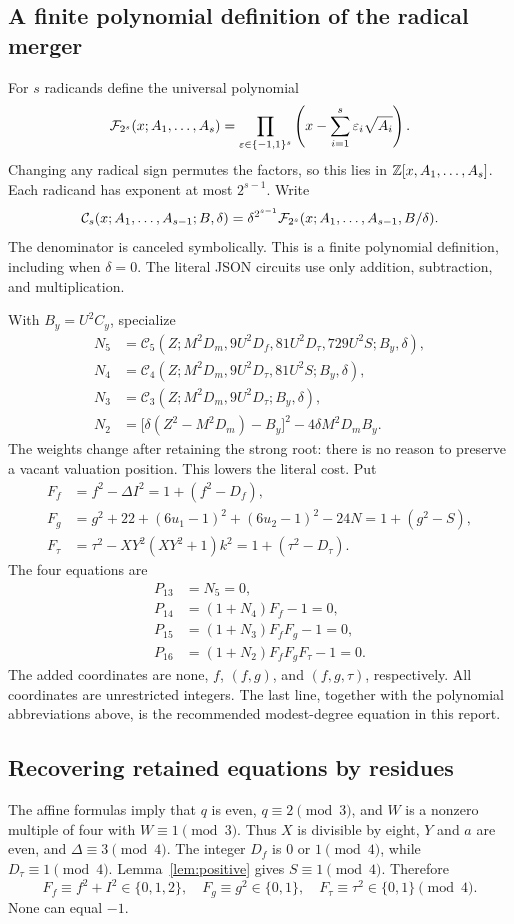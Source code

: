\subsection{A finite polynomial definition of the radical merger}
For $s$ radicands define the universal polynomial
\[
 \mathcal F_{2^s}(x;A_1,\ldots,A_s)=
 \prod_{\varepsilon\in\{-1,1\}^s}
 \left(x-\sum_{i=1}^s\varepsilon_i\sqrt{A_i}\right).
\]
Changing any radical sign permutes the factors, so this lies in
$\mathbb Z[x,A_1,\ldots,A_s]$. Each radicand has exponent at most $2^{s-1}$.
Write
\[
 \mathcal C_s(x;A_1,\ldots,A_{s-1};B,\delta)
 =\delta^{2^{s-1}}\mathcal F_{2^s}(x;A_1,\ldots,A_{s-1},B/\delta).
\]
The denominator is canceled symbolically. This is a finite polynomial
definition, including when $\delta=0$. The literal JSON circuits use
only addition, subtraction, and multiplication.

With $B_y=U^2C_y$, specialize
\begin{align*}
 N_5&=\mathcal C_5(Z;M^2D_m,9U^2D_f,81U^2D_\tau,729U^2S;B_y,\delta),\\
 N_4&=\mathcal C_4(Z;M^2D_m,9U^2D_\tau,81U^2S;B_y,\delta),\\
 N_3&=\mathcal C_3(Z;M^2D_m,9U^2D_\tau;B_y,\delta),\\
 N_2&=\bigl[\delta(Z^2-M^2D_m)-B_y\bigr]^2-4\delta M^2D_mB_y.
\end{align*}
The weights change after retaining the strong root: there is no reason
to preserve a vacant valuation position. This lowers the literal cost.
Put
\begin{align*}
 F_f&=f^2-\Delta I^2=1+(f^2-D_f),\\
 F_g&=g^2+22+(6u_1-1)^2+(6u_2-1)^2-24N=1+(g^2-S),\\
 F_\tau&=\tau^2-XY^2(XY^2+1)k^2=1+(\tau^2-D_\tau).
\end{align*}
The four equations are
\begin{align}
 P_{13}&=N_5=0,\label{eq:p13}\\
 P_{14}&=(1+N_4)F_f-1=0,\label{eq:p14}\\
 P_{15}&=(1+N_3)F_fF_g-1=0,\label{eq:p15}\\
 \boxed{P_{16}}&\boxed{=(1+N_2)F_fF_gF_\tau-1=0.}\label{eq:p16}
\end{align}
The added coordinates are none, $f$, $(f,g)$, and $(f,g,\tau)$,
respectively. All coordinates are unrestricted integers. The last line,
together with the polynomial abbreviations above, is the recommended
modest-degree equation in this report.

\subsection{Recovering retained equations by residues}
The affine formulas imply that $q$ is even, $q\equiv2\pmod3$, and
$W$ is a nonzero multiple of four with $W\equiv1\pmod3$. Thus $X$ is
divisible by eight, $Y$ and $a$ are even, and $\Delta\equiv3\pmod4$.
The integer $D_f$ is $0$ or $1\pmod4$, while $D_\tau\equiv1\pmod4$.
Lemma~\ref{lem:positive} gives $S\equiv1\pmod4$. Therefore
\[
 F_f\equiv f^2+I^2\in\{0,1,2\},\quad
 F_g\equiv g^2\in\{0,1\},\quad F_\tau\equiv\tau^2\in\{0,1\}\pmod4.
\]
None can equal $-1$.

